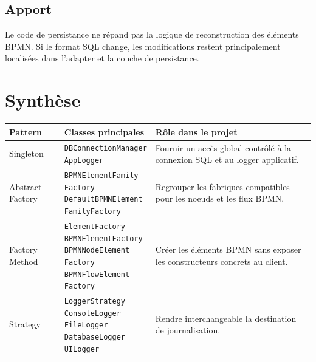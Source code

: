 \documentclass[12pt,a4paper]{article}
\makeatletter
\newcommand{\classlist}[1]{%
    \begin{tabular}[t]{@{}l@{}}#1\end{tabular}%
}
\makeatother
\begin{document}
\subsection{Apport}

Le code de persistance ne répand pas la logique de reconstruction des éléments BPMN. Si le format SQL change, les modifications restent principalement localisées dans l'adapter et la couche de persistance.

\section{Synthèse}

\begingroup
\scriptsize
\setlength{\tabcolsep}{4pt}
\renewcommand{\arraystretch}{1.25}
\begin{longtable}{|>{\raggedright\arraybackslash}p{2.6cm}|>{\raggedright\arraybackslash}p{4.8cm}|>{\raggedright\arraybackslash}p{6.7cm}|}
\hline
\textbf{Pattern} & \textbf{Classes principales} & \textbf{Rôle dans le projet} \\
\hline
Singleton &
\classlist{\texttt{DBConnectionManager}\\ \texttt{AppLogger}} &
Fournir un accès global contrôlé à la connexion SQL et au logger applicatif. \\
\hline
Abstract Factory &
\classlist{\texttt{BPMNElementFamily}\\ \texttt{Factory}\\ \texttt{DefaultBPMNElement}\\ \texttt{FamilyFactory}} &
Regrouper les fabriques compatibles pour les noeuds et les flux BPMN. \\
\hline
Factory Method &
\classlist{\texttt{ElementFactory}\\ \texttt{BPMNElementFactory}\\ \texttt{BPMNNodeElement}\\ \texttt{Factory}\\ \texttt{BPMNFlowElement}\\ \texttt{Factory}} &
Créer les éléments BPMN sans exposer les constructeurs concrets au client. \\
\hline
Strategy &
\classlist{\texttt{LoggerStrategy}\\ \texttt{ConsoleLogger}\\ \texttt{FileLogger}\\ \texttt{DatabaseLogger}\\ \texttt{UILogger}} &
Rendre interchangeable la destination de journalisation. \\

\end{longtable}
\end{document}
